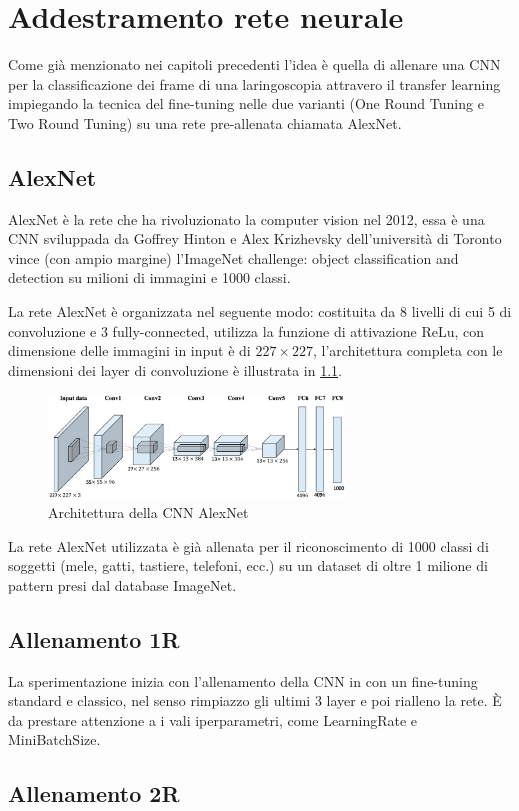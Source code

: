 \chapter{Addestramento rete neurale}\label{addestramento-rete-neurale}


Come già menzionato nei capitoli precedenti l’idea è quella di allenare una  CNN per la classificazione dei frame di una laringoscopia attravero il transfer learning impiegando la tecnica del
fine-tuning nelle due varianti (One Round Tuning e Two Round Tuning)  su una rete pre-allenata chiamata AlexNet.

\section{AlexNet}\label{alexnet}
AlexNet è la rete che ha rivoluzionato la computer vision nel 2012, essa è una CNN sviluppada
da Goffrey Hinton e Alex Krizhevsky dell’università di Toronto vince (con ampio margine)
l’ImageNet challenge: object classification and detection su milioni di immagini e 1000 classi.

La rete AlexNet è organizzata nel seguente modo: costituita da 8 livelli di cui 5 di \gls{convoluzione} e 3 \gls{fully-connected}, utilizza la funzione
di attivazione \gls{ReLu}, con dimensione delle immagini in input è di \(227\times 227\), l'architettura completa con le dimensioni dei layer di \gls{convoluzione} è illustrata in \cref{fig:alexnet}\cite{alexnet}.  

\begin{figure}[ht]
    \centering
    \includegraphics[width=0.7\textwidth]{addestramento-rete-neurale/alexnet.png}
    \caption{Architettura della CNN AlexNet}
    \label{fig:alexnet}
\end{figure}

La rete AlexNet utilizzata è già allenata per il riconoscimento di 1000 classi di soggetti (mele, gatti, tastiere, telefoni, ecc.) su un dataset di oltre 1 milione di pattern presi dal database ImageNet\cite{alexnet}.

\section{Allenamento 1R}\label{allenamento-1r}

La sperimentazione inizia con l'allenamento della CNN in con un fine-tuning standard e classico, nel senso rimpiazzo gli ultimi 3 layer e poi rialleno la rete. È da prestare attenzione a i vali iperparametri, come \Gls{LearningRate} e \Gls{MiniBatchSize}.

\section{Allenamento 2R}\label{allenamento-2r}

